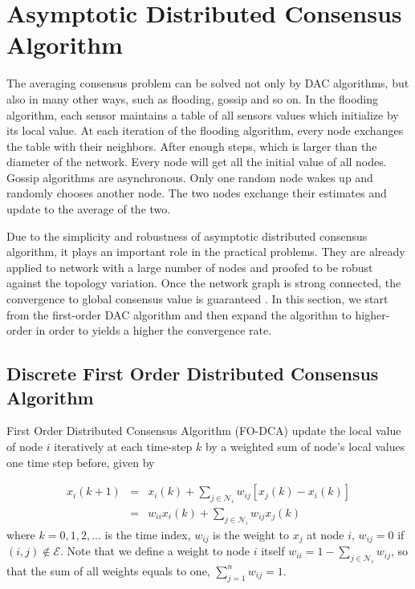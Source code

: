
\section{Asymptotic Distributed Consensus Algorithm}

The averaging consensus problem can be solved not only by DAC algorithms,
but also in many other ways, such as flooding, gossip and so on. In
the flooding algorithm, each sensor maintains a table of all sensors
values which initialize by its local value. At each iteration of the
flooding algorithm, every node exchanges the table with their neighbors.
After enough steps, which is larger than the diameter of the network.
Every node will get all the initial value of all nodes. Gossip algorithms
are asynchronous. Only one random node wakes up and randomly chooses
another node. The two nodes exchange their estimates and update to
the average of the two. 

Due to the simplicity and robustness of asymptotic distributed consensus
algorithm, it plays an important role in the practical problems. They
are already applied to network with a large number of nodes and proofed
to be robust against the topology variation. Once the network graph
is strong connected, the convergence to global consensus value is
guaranteed \cite{Ren2007}. In this section, we start from the first-order
DAC algorithm and then expand the algorithm to higher-order in order
to yields a higher the convergence rate.


\subsection{\label{sub:DT-First-Order-DAC}Discrete First Order Distributed Consensus
Algorithm}

First Order Distributed Consensus Algorithm (FO-DCA) update the local
value of node $i$ iteratively at each time-step $k$ by a weighted
sum of node\textquoteright{}s local values one time step before, given
by 

\begin{eqnarray}
x_{i}(k+1) & = & x_{i}(k)+\sum_{j\in\mathcal{N}_{i}}w_{ij}\left[x_{j}(k)-x_{i}(k)\right]\label{eq:1st iter. ni}\\
 & = & w_{ii}x_{i}(k)+\sum_{j\in\mathcal{N}_{i}}w_{ij}x_{j}(k)
\end{eqnarray}
where $k=0,1,2,...$ is the time index, $w_{ij}$ is the weight to
$x_{j}$ at node $i$, $w_{ij}=0$ if $(i,j)\notin\mathcal{E}$. Note
that we define a weight to node $i$ itself $w_{ii}=1-\sum_{j\in\mathcal{N}_{i}}w_{ij}$,
so that the sum of all weights equals to one, $\sum_{j=1}^{n}w_{ij}=1$. 

